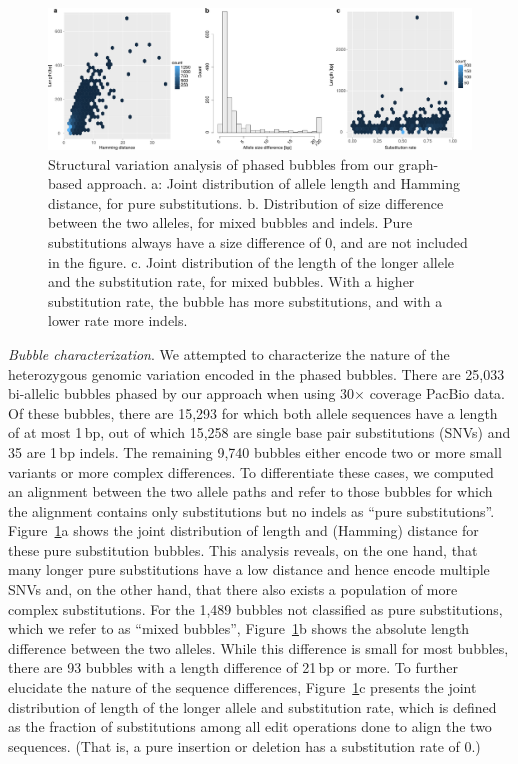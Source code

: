 \begin{figure}[t!]
\begin{center}
\includegraphics[width=\textwidth]{bubble-breakdown}%
\end{center}
\caption{Structural variation analysis of phased bubbles from our graph-based approach.
a: Joint distribution of allele length and Hamming distance, for pure substitutions.
b. Distribution of size difference between the two alleles, for mixed bubbles and indels. 
Pure substitutions always have a size difference of 0, and are not included in the figure.
c. Joint distribution of the length of the longer allele and the substitution rate, for mixed bubbles.
With a higher substitution rate, the bubble has more substitutions, and with a lower rate more indels.
}
\label{fig:bubble_breakdown}
\end{figure}

\textit{Bubble characterization}.
We attempted to characterize the nature of the heterozygous genomic variation encoded in the phased bubbles.
There are 25,033 bi-allelic bubbles phased by our approach when using 30$\times$ coverage PacBio data.
Of these bubbles, there are 15,293 for which both allele sequences have a length of at most 1\,bp, out of which 15,258 are single base pair substitutions (SNVs) and 35 are 1\,bp indels.
The remaining 9,740 bubbles either encode two or more small variants or more complex differences.
To differentiate these cases, we computed an alignment between the two allele paths and refer to those bubbles for which the alignment contains only substitutions but no indels as ``pure substitutions''.
Figure~\ref{fig:bubble_breakdown}a shows the joint distribution of length and (Hamming) distance for these pure substitution bubbles.
This analysis reveals, on the one hand, that many longer pure substitutions have a low distance and hence encode multiple SNVs and, on the other hand, that there also exists a population of more complex substitutions.
For the 1,489 bubbles not classified as pure substitutions, which we refer to as ``mixed bubbles'', Figure~\ref{fig:bubble_breakdown}b shows the absolute length difference between the two alleles.
While this difference is small for most bubbles, there are 93 bubbles with a length difference of 21\,bp or more.
To further elucidate the nature of the sequence differences, Figure~\ref{fig:bubble_breakdown}c presents the joint distribution of length of the longer allele and substitution rate, which is defined as the fraction of substitutions among all edit operations done to align the two sequences. (That is, a pure insertion or deletion has a substitution rate of 0.)



